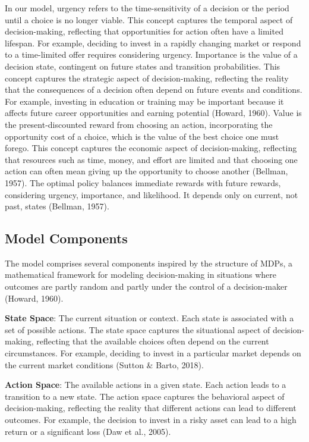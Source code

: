 \documentclass[
]{report}
\begin{document}
In our model, urgency refers to the time-sensitivity of a decision or
the period until a choice is no longer viable. This concept captures the
temporal aspect of decision-making, reflecting that opportunities for
action often have a limited lifespan. For example, deciding to invest in
a rapidly changing market or respond to a time-limited offer requires
considering urgency. Importance is the value of a decision state,
contingent on future states and transition probabilities. This concept
captures the strategic aspect of decision-making, reflecting the reality
that the consequences of a decision often depend on future events and
conditions. For example, investing in education or training may be
important because it affects future career opportunities and earning
potential (Howard, 1960). Value is the present-discounted reward from
choosing an action, incorporating the opportunity cost of a choice,
which is the value of the best choice one must forego. This concept
captures the economic aspect of decision-making, reflecting that
resources such as time, money, and effort are limited and that choosing
one action can often mean giving up the opportunity to choose another
(Bellman, 1957). The optimal policy balances immediate rewards with
future rewards, considering urgency, importance, and likelihood. It
depends only on current, not past, states (Bellman, 1957).

\hypertarget{model-components}{%
\subsection{Model Components}\label{model-components}}

The model comprises several components inspired by the structure of
MDPs, a mathematical framework for modeling decision-making in
situations where outcomes are partly random and partly under the control
of a decision-maker (Howard, 1960).

\textbf{State Space}: The current situation or context. Each state is
associated with a set of possible actions. The state space captures the
situational aspect of decision-making, reflecting that the available
choices often depend on the current circumstances. For example, deciding
to invest in a particular market depends on the current market
conditions (Sutton \& Barto, 2018).

\textbf{Action Space}: The available actions in a given state. Each
action leads to a transition to a new state. The action space captures
the behavioral aspect of decision-making, reflecting the reality that
different actions can lead to different outcomes. For example, the
decision to invest in a risky asset can lead to a high return or a
significant loss (Daw et al., 2005).
\end{document}
